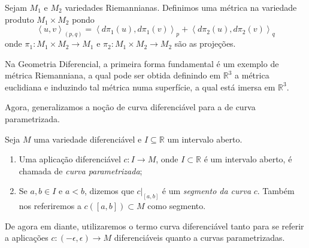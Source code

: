 \begin{example}
	\label{ex:metrica-produto}
	Sejam $M_{1}$ e $M_{2}$ variedades Riemannianas. Definimos uma métrica na variedade produto $M_{1}\times M_{2}$ pondo
	\begin{equation*}
		\left< u, v \right>_{(p,q)}=\left< d\pi_{1}(u), d\pi_{1}(v) \right>_{p}+\left< d\pi_{2}(u),d\pi_{2}(v)  \right>_{q}
	\end{equation*}
	onde $\pi_{1}:M_{1}\times M_{2} \to M_{1}$ e $\pi_{2}:M_{1}\times M_{2}\to M_{2}$ são as projeções.
\end{example}
\begin{example}
	\label{ex:geometria-diferencial}
	Na Geometria Diferencial, a primeira forma fundamental é um exemplo de métrica Riemanniana, a qual pode ser obtida definindo em $\mathbb{R}^{3}$ a métrica euclidiana e induzindo tal métrica numa superfície, a qual está imersa em $\mathbb{R}^{3}$.
\end{example}
Agora, generalizamos a noção de curva diferenciável para a de curva parametrizada.
\begin{definition}
	\label{def:curva-parametrizada}
	Seja $M$ uma variedade diferenciável e $I \subseteq \mathbb{R}$ um intervalo aberto.
	\begin{enumerate}[label=(\roman*)]
		\item Uma aplicação diferenciável $c:I\to M$, onde $I \subset \mathbb{R}$ é um intervalo aberto, é chamada de \emph{curva parametrizada};
		\item Se $a,b \in I$ e $a <b$, dizemos que $c|_{[a,b]}$ é um \emph{segmento da curva} $c$. Também nos referiremos a $c([a,b])\subset M$ como segmento.
	\end{enumerate}
\end{definition}
De agora em diante, utilizaremos o termo curva diferenciável tanto para se referir a aplicações $c:(-\epsilon, \epsilon)\to M$ diferenciáveis quanto a curvas parametrizadas.

